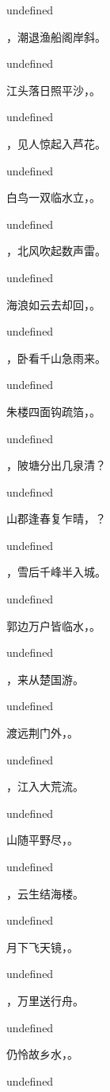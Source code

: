 \documentclass[12pt, a4paper, addpoints]{exam}
\begin{document}
\begin{questions}
undefined

\question[3] \fillin，潮退渔船阁岸斜。

undefined

\question[3] 江头落日照平沙，\fillin。

undefined

\question[3] \fillin，见人惊起入芦花。

undefined

\question[3] 白鸟一双临水立，\fillin。

undefined

\question[3] \fillin，北风吹起数声雷。

undefined

\question[3] 海浪如云去却回，\fillin。

undefined

\question[3] \fillin，卧看千山急雨来。

undefined

\question[3] 朱楼四面钩疏箔，\fillin。

undefined

\question[3] \fillin，陂塘分出几泉清？

undefined

\question[3] 山郡逢春复乍晴，\fillin？

undefined

\question[3] \fillin，雪后千峰半入城。

undefined

\question[3] 郭边万户皆临水，\fillin。

undefined

\question[3] \fillin，来从楚国游。

undefined

\question[3] 渡远荆门外，\fillin。

undefined

\question[3] \fillin，江入大荒流。

undefined

\question[3] 山随平野尽，\fillin。

undefined

\question[3] \fillin，云生结海楼。

undefined

\question[3] 月下飞天镜，\fillin。

undefined

\question[3] \fillin，万里送行舟。

undefined

\question[3] 仍怜故乡水，\fillin。

undefined


\end{questions}
\end{document}
